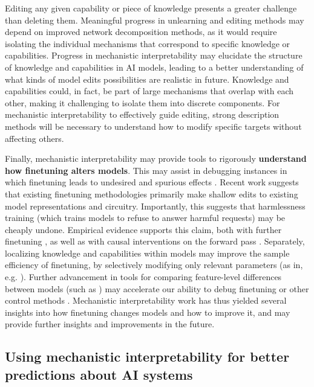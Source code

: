 Editing any given capability or piece of knowledge presents a greater challenge than deleting them. Meaningful progress in unlearning and editing methods may depend on improved network decomposition methods, as it would require isolating the individual mechanisms that correspond to specific knowledge or capabilities. Progress in mechanistic interpretability may elucidate the structure of knowledge and capabilities in AI models, leading to a better understanding of what kinds of model edits possibilities are realistic in future. Knowledge and capabilities could, in fact, be part of large mechanisms that overlap with each other, making it challenging to isolate them into discrete components. For mechanistic interpretability to effectively guide editing, strong description methods will be necessary to understand how to modify specific targets without affecting others.

Finally, mechanistic interpretability may provide tools to rigorously \textbf{understand how finetuning alters models}. This may assist in debugging instances in which finetuning leads to undesired and spurious effects \citep{casper2023openproblemsfundamentallimitations}. Recent work \citep{jain2024mechanisticallyanalyzingeffectsfinetuning, prakash2024finetuningenhancesexistingmechanisms, lee2024mechanisticunderstandingalignmentalgorithms} suggests that existing finetuning methodologies primarily make shallow edits to existing model representations and circuitry. Importantly, this suggests that harmlessness training (which trains models to refuse to answer harmful requests) may be cheaply undone. Empirical evidence supports this claim, both with further finetuning \citep{gade2024badllamacheaplyremovingsafety,lermen2024lorafinetuningefficientlyundoes}, as well as with causal interventions on the forward pass \citep{arditi2024refusallanguagemodelsmediated}. Separately, localizing knowledge and capabilities within models may improve the sample efficiency of finetuning, by selectively modifying only relevant parameters (as in, e.g. \citet{wu2024reftrepresentationfinetuninglanguage}). Further advancement in tools for comparing feature-level differences between models (such as \citet{lindsey2024crosscoders}) may accelerate our ability to debug finetuning or other control methods \citep{bricken2024stage}. Mechanistic interpretability work has thus yielded several insights into how finetuning changes models and how to improve it, and may provide further insights and improvements in the future. 

\subsection{Using mechanistic interpretability for better predictions about AI systems}
\label{subsec:better-predictions}

